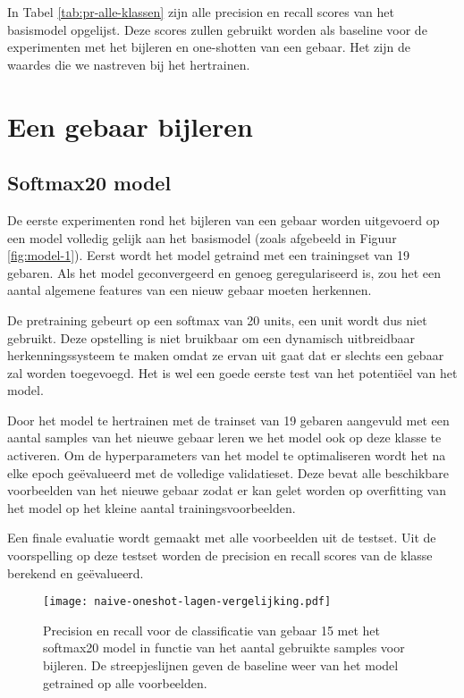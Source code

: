 \npar In Tabel \ref{tab:pr-alle-klassen} zijn alle precision en recall scores van het basismodel opgelijst. Deze scores zullen gebruikt worden als baseline voor de experimenten met het bijleren en one-shotten van een gebaar. Het zijn de waardes die we nastreven bij het hertrainen.



\section{Een gebaar bijleren}\label{sec:experimenten}

\subsection{Softmax20 model}\label{sec:softmax20}

De eerste experimenten rond het bijleren van een gebaar worden uitgevoerd op een model volledig gelijk aan het basismodel (zoals afgebeeld in Figuur \ref{fig:model-1}). Eerst wordt het model getraind met een trainingset van 19 gebaren. Als het model geconvergeerd en genoeg geregulariseerd is, zou het een aantal algemene features van een nieuw gebaar moeten herkennen.

\npar De pretraining gebeurt op een softmax van 20 units, een unit wordt dus niet gebruikt. Deze opstelling is niet bruikbaar om een dynamisch uitbreidbaar herkenningssysteem te maken omdat ze ervan uit gaat dat er slechts een gebaar zal worden toegevoegd. Het is wel een goede eerste test van het potenti\"eel van het model.

\npar Door het model te hertrainen met de trainset van 19 gebaren aangevuld met een aantal samples van het nieuwe gebaar leren we het model ook op deze klasse te activeren. Om de hyperparameters van het model te optimaliseren wordt het na elke epoch ge\"evalueerd met de volledige validatieset. Deze bevat alle beschikbare voorbeelden van het nieuwe gebaar zodat er kan gelet worden op overfitting van het model op het kleine aantal trainingsvoorbeelden.

\npar Een finale evaluatie wordt gemaakt met alle voorbeelden uit de testset. Uit de voorspelling op deze testset worden de precision en recall scores van de klasse berekend en ge\"evalueerd.

\begin{figure}
	\centering
	\texttt{[image: naive-oneshot-lagen-vergelijking.pdf]}
	\caption{Precision en recall voor de classificatie van gebaar 15 met het softmax20 model in functie van het aantal gebruikte samples voor bijleren. De streepjeslijnen geven de baseline weer van het model getrained op alle voorbeelden.}\label{fig:naive-model}
\end{figure}

